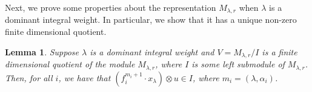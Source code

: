 \documentclass{amsart}
\numberwithin{equation}{section}
\theoremstyle{theorem}
\newtheorem{lemma}[theorem]{Lemma}
\theoremstyle{definition}
\newcommand{\sll}{\mathfrak{sl}}
\newcommand{\uvsln}{U_v(\sll_n)}
\begin{document}
Next, we prove some properties about the representation $M_{\lambda, r}$ when $\lambda$ is a dominant integral weight. In particular, we show that it has a unique non-zero finite dimensional quotient.

\begin{lemma} \label{lem:Jantzen}
Suppose $\lambda$ is a dominant integral weight and $V=M_{\lambda,r}/I$ is a finite dimensional quotient of the module $M_{\lambda,r}$, where $I$ is some left submodule of $M_{\lambda,r}$. Then, for all $i$, we have that $(f_i^{m_i+1}\cdot x_{\lambda})\otimes u \in I$, where $m_i=(\lambda,\alpha_i)$.
\end{lemma}
\end{document}
